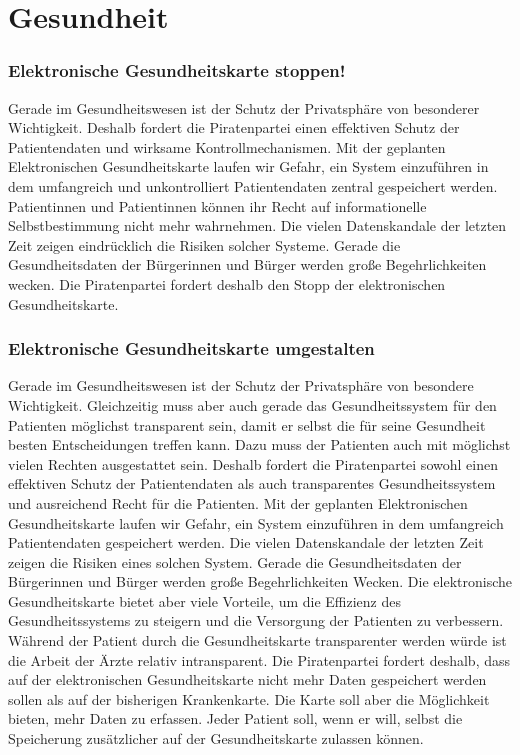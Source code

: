 \section{Gesundheit}

\label{wp:gesundheit:egk1}

\subsubsection{Elektronische Gesundheitskarte stoppen!}
\abstimmung
Gerade im Gesundheitswesen ist der Schutz der Privatsphäre von besonderer Wichtigkeit. Deshalb fordert die Piratenpartei einen effektiven Schutz der Patientendaten und wirksame Kontrollmechanismen. Mit der geplanten Elektronischen Gesundheitskarte laufen wir Gefahr, ein System einzuführen in dem umfangreich und unkontrolliert Patientendaten zentral gespeichert werden. Patientinnen und Patientinnen können ihr Recht auf informationelle Selbstbestimmung nicht mehr wahrnehmen. Die vielen Datenskandale der letzten Zeit zeigen eindrücklich die Risiken solcher Systeme. Gerade die Gesundheitsdaten der Bürgerinnen und Bürger werden große Begehrlichkeiten wecken. Die Piratenpartei fordert deshalb den Stopp der elektronischen Gesundheitskarte.
 

\label{wp:gesundheit:egk2}

\subsubsection{Elektronische Gesundheitskarte umgestalten}
\abstimmung
Gerade im Gesundheitswesen ist der Schutz der Privatsphäre von besondere Wichtigkeit. Gleichzeitig muss aber auch gerade das Gesundheitssystem für den Patienten möglichst transparent sein, damit er selbst die für seine Gesundheit besten Entscheidungen treffen kann. Dazu muss der Patienten auch mit möglichst vielen Rechten ausgestattet sein. Deshalb fordert die Piratenpartei sowohl einen effektiven Schutz der Patientendaten als auch transparentes Gesundheitssystem und ausreichend Recht für die Patienten. Mit der geplanten Elektronischen Gesundheitskarte laufen wir Gefahr, ein System einzuführen in dem umfangreich Patientendaten gespeichert werden. Die vielen Datenskandale der letzten Zeit zeigen die Risiken eines solchen System. Gerade die Gesundheitsdaten der Bürgerinnen und Bürger werden große Begehrlichkeiten Wecken. Die elektronische Gesundheitskarte bietet aber viele Vorteile, um die Effizienz des Gesundheitssystems zu steigern und die Versorgung der Patienten zu verbessern. Während der Patient durch die Gesundheitskarte transparenter werden würde ist die Arbeit der Ärzte relativ intransparent. Die Piratenpartei fordert deshalb, dass auf der elektronischen Gesundheitskarte nicht mehr Daten gespeichert werden sollen als auf der bisherigen Krankenkarte. Die Karte soll aber die Möglichkeit bieten, mehr Daten zu erfassen. Jeder Patient soll, wenn er will, selbst die Speicherung zusätzlicher auf der Gesundheitskarte zulassen können.
 
